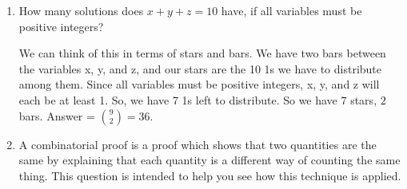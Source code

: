 \documentclass[11pt,preview]{standalone} %
\begin{document}
\begin{enumerate}
\item How many solutions does $x + y + z = 10$ have, if all variables 
must be positive integers? 
\begin{Freeform}{36}
\Solution We can think of this in terms of stars and bars. We have two bars between the variables x, y, and z, and our stars are the 10 1s we have to distribute among them. Since all variables must be positive integers, x, y, and z will each be at least 1. So, we have 7 1s left to distribute. So we have $7$ stars, $2$ bars. Answer = $ {9 \choose 2} = 36$.
\end{Freeform}

\item A combinatorial proof is a proof which shows that two quantities are the same by explaining that each quantity is a different way of counting the same thing. This question is intended to help you see how this technique is applied.


\end{enumerate}
\end{document}

